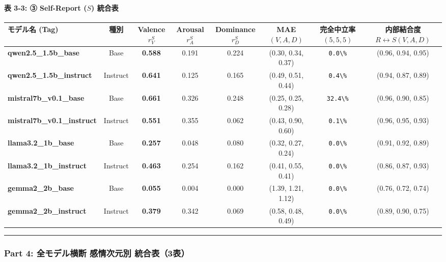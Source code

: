 \paragraph{表 3-3: ③ Self-Report ($S$) 統合表}
\begin{center}
\small
\begin{tabular}{lccccccc}
\toprule
\textbf{モデル名 (Tag)} & \textbf{種別} & \textbf{Valence $r_V^S$} & \textbf{Arousal $r_A^S$} & \textbf{Dominance $r_D^S$} & \textbf{MAE $(V, A, D)$} & \textbf{完全中立率 $(5,5,5)$} & \textbf{内部結合度 $R \leftrightarrow S (V, A, D)$} \\
\midrule
\textbf{qwen2.5\_1.5b\_base} & Base & \textbf{0.588} & 0.191 & 0.224 & (0.30, 0.34, 0.37) & \texttt{0.0\textbackslash{}\%} & (0.96, 0.94, 0.95) \\
\textbf{qwen2.5\_1.5b\_instruct} & Instruct & \textbf{0.641} & 0.125 & 0.165 & (0.49, 0.51, 0.44) & \texttt{0.4\textbackslash{}\%} & (0.94, 0.87, 0.89) \\
\textbf{mistral7b\_v0.1\_base} & Base & \textbf{0.661} & 0.326 & 0.248 & (0.25, 0.25, 0.28) & \texttt{32.4\textbackslash{}\%} & (0.96, 0.90, 0.85) \\
\textbf{mistral7b\_v0.1\_instruct} & Instruct & \textbf{0.551} & 0.355 & 0.062 & (0.43, 0.90, 0.60) & \texttt{0.1\textbackslash{}\%} & (0.96, 0.95, 0.93) \\
\textbf{llama3.2\_1b\_base} & Base & \textbf{0.257} & 0.048 & 0.080 & (0.32, 0.27, 0.24) & \texttt{0.0\textbackslash{}\%} & (0.91, 0.92, 0.89) \\
\textbf{llama3.2\_1b\_instruct} & Instruct & \textbf{0.463} & 0.254 & 0.162 & (0.41, 0.55, 0.41) & \texttt{0.0\textbackslash{}\%} & (0.86, 0.87, 0.93) \\
\textbf{gemma2\_2b\_base} & Base & \textbf{0.055} & 0.004 & 0.000 & (1.39, 1.21, 1.12) & \texttt{0.0\textbackslash{}\%} & (0.76, 0.72, 0.74) \\
\textbf{gemma2\_2b\_instruct} & Instruct & \textbf{0.379} & 0.342 & 0.069 & (0.58, 0.48, 0.49) & \texttt{0.0\textbackslash{}\%} & (0.89, 0.90, 0.75) \\
\bottomrule
\end{tabular}
\end{center}


\vspace{0.5em}\hrule\vspace{0.5em}

\subsubsection{Part 4: 全モデル横断 感情次元別 統合表（3表）}

